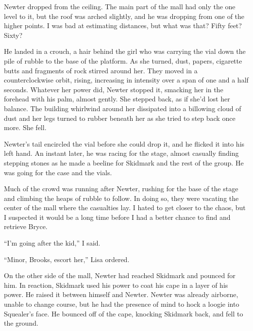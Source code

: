 





Newter dropped from the ceiling.  The main part of the mall had only the one level to it, but the roof was arched slightly, and he was dropping from one of the higher points.  I was bad at estimating distances, but what was that?  Fifty feet? Sixty?



He landed in a crouch, a hair behind the girl who was carrying the vial down the pile of rubble to the base of the platform.  As she turned, dust, papers, cigarette butts and fragments of rock stirred around her.  They moved in a counterclockwise orbit, rising, increasing in intensity over a span of one and a half seconds.  Whatever her power did, Newter stopped it, smacking her in the forehead with his palm, almost gently.  She stepped back, as if she'd lost her balance.  The building whirlwind around her dissipated into a billowing cloud of dust and her legs turned to rubber beneath her as she tried to step back once more. She fell.



Newter's tail encircled the vial before she could drop it, and he flicked it into his left hand.  An instant later, he was racing for the stage, almost casually finding stepping stones as he made a beeline for Skidmark and the rest of the group.  He was going for the case and the vials.



Much of the crowd was running after Newter, rushing for the base of the stage and climbing the heaps of rubble to follow.  In doing so, they were vacating the center of the mall where the casualties lay.  I hated to get closer to the chaos, but I suspected it would be a long time before I had a better chance to find and retrieve Bryce.



``I'm going after the kid,'' I said.



``Minor, Brooks, escort her,'' Lisa ordered.



On the other side of the mall, Newter had reached Skidmark and pounced for him.  In reaction, Skidmark used his power to coat his cape in a layer of his power.  He raised it between himself and Newter.  Newter was already airborne, unable to change course, but he had the presence of mind to hock a loogie into Squealer's face.  He bounced off of the cape, knocking Skidmark back, and fell to the ground.



